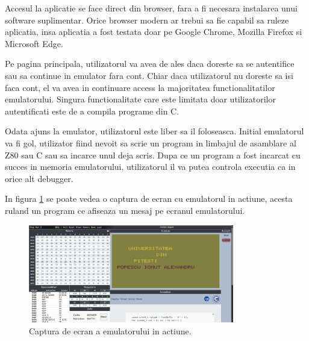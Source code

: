 \documentclass[titlepage,12pt]{article}
\begin{document}
Accesul la aplicatie se face direct din browser, fara a fi necesara instalarea unui software suplimentar. Orice browser modern ar trebui sa fie capabil sa ruleze aplicatia, insa aplicatia a fost testata doar pe Google Chrome, Mozilla Firefox si Microsoft Edge.

Pe pagina principala, utilizatorul va avea de ales daca doreste sa se autentifice sau sa continue in emulator fara cont. Chiar daca utilizatorul nu doreste sa isi faca cont, el va avea in continuare access la majoritatea functionalitatilor emulatorului. Singura functionalitate care este limitata doar utilizatorilor autentificati este de a compila programe din C.

Odata ajuns la emulator, utilizatorul este liber sa il foloseasca. Initial emulatorul va fi gol, utilizator fiind nevoit sa scrie un program in limbajul de asamblare al \ac {Z80} sau C sau sa incarce unul deja scris. Dupa ce un program a fost incarcat cu succes in memoria emulatorului, utilizatorul il va putea controla executia ca in orice alt debugger.

In figura \cref{fig:upitemu} se poate vedea o captura de ecran cu emulatorul in actiune, acesta ruland un program ce afiseaza un mesaj pe ecranul emulatorului.
\begin{figure}[H]
    \centering
    \includegraphics[width=0.8\textwidth]{images/upitemu.png}
    \caption{Captura de ecran a emulatorului in actiune.}
    \label{fig:upitemu}
\end{figure}
\end{document}
